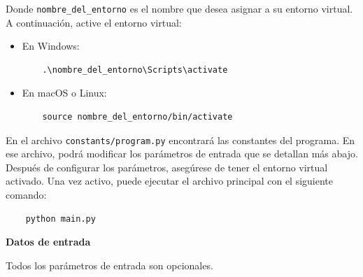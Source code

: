 \documentclass{article}
\begin{document}
Donde \texttt{nombre\_del\_entorno} es el nombre que desea asignar a su entorno virtual.
A continuación, active el entorno virtual:

\begin{itemize}
  \item En Windows:
        \begin{verbatim}
    .\nombre_del_entorno\Scripts\activate
  \end{verbatim}
  \item En macOS o Linux:
        \begin{verbatim}
    source nombre_del_entorno/bin/activate
  \end{verbatim}
\end{itemize}

En el archivo \texttt{constants/program.py} encontrará las constantes del programa.
En ese archivo, podrá modificar los parámetros de entrada que se detallan más abajo.\\

Después de configurar los parámetros, asegúrese de tener el entorno virtual activado.
Una vez activo, puede ejecutar el archivo principal con el siguiente comando:

\begin{center}
  \begin{adjustbox}{minipage=\linewidth, center}
    \begin{verbatim}
    python main.py
  \end{verbatim}
  \end{adjustbox}
\end{center}

\textbf{Datos de entrada}

Todos los parámetros de entrada son opcionales.
\end{document}
